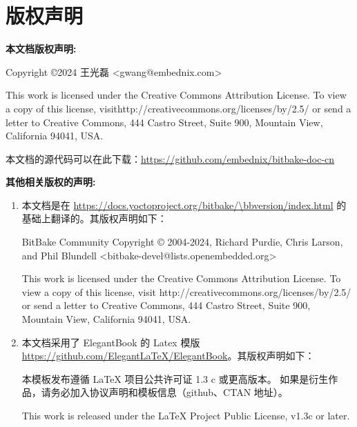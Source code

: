 \chapter*{版权声明}

\textbf{本文档版权声明:}

Copyright \copyright 2024 王光磊 <gwang@embednix.com>

This work is licensed under the Creative Commons Attribution License. To view a copy of this license, visit\linebreak http://creativecommons.org/licenses/by/2.5/ or send a letter to Creative Commons, 444 Castro Street, Suite 900, Mountain View, California 94041, USA.

本文档的源代码可以在此下载：\url{https://github.com/embednix/bitbake-doc-cn}


\textbf{其他相关版权的声明:}

\begin{enumerate}    
\item 本文档是在 \url{https://docs.yoctoproject.org/bitbake/\bbversion/index.html} 的基础上翻译的。其版权声明如下：

\medskip
BitBake Community
Copyright © 2004-2024, Richard Purdie, Chris Larson, and Phil Blundell\linebreak
<bitbake-devel@lists.openembedded.org>

\medskip
This work is licensed under the Creative Commons Attribution License. To view a copy of this license, visit \linebreak http://creativecommons.org/licenses/by/2.5/ or send a letter to Creative Commons, 444 Castro Street, Suite 900, Mountain View, California 94041, USA.

\medskip
\item 本文档采用了 ElegantBook 的 Latex 模版 \url{https://github.com/ElegantLaTeX/ElegantBook}。其版权声明如下：

\medskip
本模板发布遵循 LaTeX 项目公共许可证 1.3 c 或更高版本。 如果是衍生作品，请务必加入协议声明和模板信息（github、CTAN 地址）。

\medskip
This work is released under the LaTeX Project Public License, v1.3c or later.
\end{enumerate}



